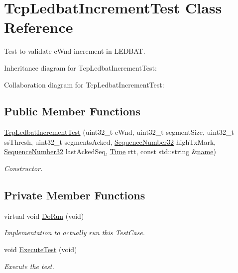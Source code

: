 \hypertarget{classTcpLedbatIncrementTest}{}\section{Tcp\+Ledbat\+Increment\+Test Class Reference}
\label{classTcpLedbatIncrementTest}


Test to validate c\+Wnd increment in L\+E\+D\+B\+AT.  




Inheritance diagram for Tcp\+Ledbat\+Increment\+Test\+:


Collaboration diagram for Tcp\+Ledbat\+Increment\+Test\+:
\subsection*{Public Member Functions}
\begin{DoxyCompactItemize}
\item 
\hyperlink{classTcpLedbatIncrementTest_a8b73bfc63547d2b99abc3bad6656b6b8}{Tcp\+Ledbat\+Increment\+Test} (uint32\+\_\+t c\+Wnd, uint32\+\_\+t segment\+Size, uint32\+\_\+t ss\+Thresh, uint32\+\_\+t segments\+Acked, \hyperlink{group__network_gacb2070e4e98d2d5135c9bede58f07a03}{Sequence\+Number32} high\+Tx\+Mark, \hyperlink{group__network_gacb2070e4e98d2d5135c9bede58f07a03}{Sequence\+Number32} last\+Acked\+Seq, \hyperlink{classns3_1_1Time}{Time} rtt, const std\+::string \&\hyperlink{generate__test__data__lte__spectrum__model_8m_ab74e6bf80237ddc4109968cedc58c151}{name})
\begin{DoxyCompactList}\small\item\em Constructor. \end{DoxyCompactList}\end{DoxyCompactItemize}
\subsection*{Private Member Functions}
\begin{DoxyCompactItemize}
\item 
virtual void \hyperlink{classTcpLedbatIncrementTest_a673d2a03d6203b5750744776b3ab14b9}{Do\+Run} (void)
\begin{DoxyCompactList}\small\item\em Implementation to actually run this Test\+Case. \end{DoxyCompactList}\item 
void \hyperlink{classTcpLedbatIncrementTest_a84a03d2ecd9136e498c22721122e2b6b}{Execute\+Test} (void)
\begin{DoxyCompactList}\small\item\em Execute the test. \end{DoxyCompactList}\end{DoxyCompactItemize}
